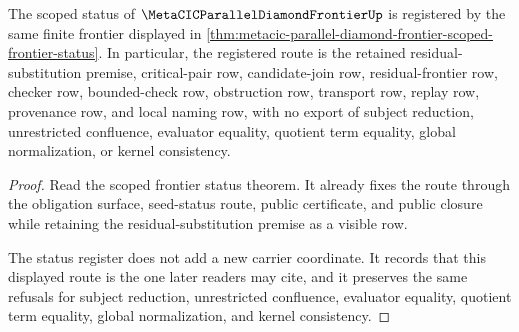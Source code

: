 \begin{theorem}
\label{thm:metacic-parallel-diamond-frontier-scoped-status-register}
The scoped status of $\MetaCICParallelDiamondFrontierUp$ is registered by the same finite frontier displayed in \autoref{thm:metacic-parallel-diamond-frontier-scoped-frontier-status}. In particular, the registered route is the retained residual-substitution premise, critical-pair row, candidate-join row, residual-frontier row, checker row, bounded-check row, obstruction row, transport row, replay row, provenance row, and local naming row, with no export of subject reduction, unrestricted confluence, evaluator equality, quotient term equality, global normalization, or kernel consistency.
\end{theorem}
\begin{proof}
Read the scoped frontier status theorem. It already fixes the route through the obligation surface, seed-status route, public certificate, and public closure while retaining the residual-substitution premise as a visible row.

The status register does not add a new carrier coordinate. It records that this displayed route is the one later readers may cite, and it preserves the same refusals for subject reduction, unrestricted confluence, evaluator equality, quotient term equality, global normalization, and kernel consistency.
\end{proof}


